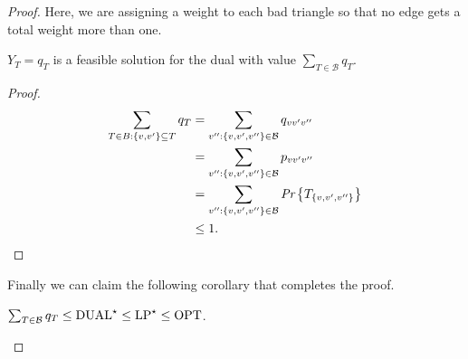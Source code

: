 \begin{proof}
	Here, we are assigning a weight to each bad triangle so that no edge gets a total weight more than one. 
	\begin{thm}
		$Y_T = q_T$ is a feasible solution for the dual with value $\sum_{T \in \mathcal{B}} q_T$.
	\end{thm}

	\begin{proof}
		
		\begin{align}
		\sum_{T \in B : \{v,v'\} \subseteq T} q_T &= \sum_{v'': \{v,v',v''\} \in \mathcal{B}}q_{vv'v''}\\
		&=\sum_{v'':\{v,v',v''\} \in \mathcal{B}} p_{vv'v''} \\
		&=\sum_{v'':\{v,v',v''\} \in \mathcal{B}} \emph{Pr}\left\{T_{\{v,v',v''\}}\right\}\\
		& \leq 1.
		\end{align}
	\end{proof}

Finally we can claim the following corollary that completes the proof.
		\begin{cor}
			$\sum_{T \in \mathcal{B}} q_T \leq \text{DUAL}^\star \leq \text{LP}^\star \leq \text{OPT}$.
		\end{cor}
	\end{proof}
